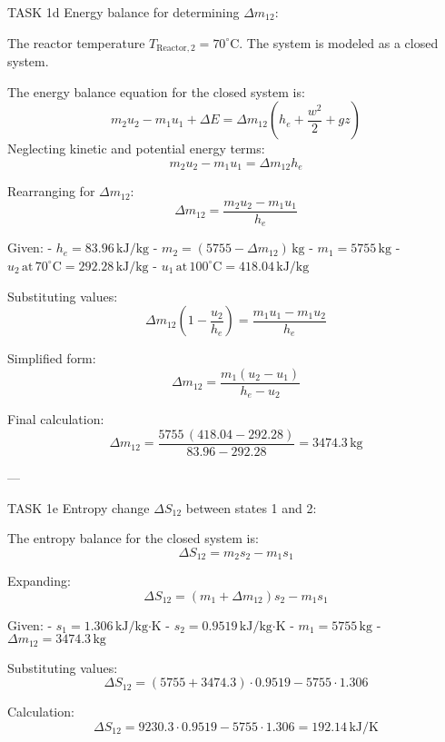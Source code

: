 TASK 1d  
Energy balance for determining \( \Delta m_{12} \):  

The reactor temperature \( T_{\text{Reactor},2} = 70^\circ\text{C} \).  
The system is modeled as a closed system.  

The energy balance equation for the closed system is:  
\[
m_2 u_2 - m_1 u_1 + \Delta E = \Delta m_{12} \left( h_e + \frac{w^2}{2} + g z \right)
\]  
Neglecting kinetic and potential energy terms:  
\[
m_2 u_2 - m_1 u_1 = \Delta m_{12} h_e
\]  

Rearranging for \( \Delta m_{12} \):  
\[
\Delta m_{12} = \frac{m_2 u_2 - m_1 u_1}{h_e}
\]  

Given:  
- \( h_e = 83.96 \, \text{kJ/kg} \)  
- \( m_2 = (5755 - \Delta m_{12}) \, \text{kg} \)  
- \( m_1 = 5755 \, \text{kg} \)  
- \( u_2 \, \text{at} \, 70^\circ\text{C} = 292.28 \, \text{kJ/kg} \)  
- \( u_1 \, \text{at} \, 100^\circ\text{C} = 418.04 \, \text{kJ/kg} \)  

Substituting values:  
\[
\Delta m_{12} \left( 1 - \frac{u_2}{h_e} \right) = \frac{m_1 u_1 - m_1 u_2}{h_e}
\]  

Simplified form:  
\[
\Delta m_{12} = \frac{m_1 (u_2 - u_1)}{h_e - u_2}
\]  

Final calculation:  
\[
\Delta m_{12} = \frac{5755 \, (418.04 - 292.28)}{83.96 - 292.28} = 3474.3 \, \text{kg}
\]  

---

TASK 1e  
Entropy change \( \Delta S_{12} \) between states 1 and 2:  

The entropy balance for the closed system is:  
\[
\Delta S_{12} = m_2 s_2 - m_1 s_1
\]  

Expanding:  
\[
\Delta S_{12} = (m_1 + \Delta m_{12}) s_2 - m_1 s_1
\]  

Given:  
- \( s_1 = 1.306 \, \text{kJ/kg·K} \)  
- \( s_2 = 0.9519 \, \text{kJ/kg·K} \)  
- \( m_1 = 5755 \, \text{kg} \)  
- \( \Delta m_{12} = 3474.3 \, \text{kg} \)  

Substituting values:  
\[
\Delta S_{12} = (5755 + 3474.3) \cdot 0.9519 - 5755 \cdot 1.306
\]  

Calculation:  
\[
\Delta S_{12} = 9230.3 \cdot 0.9519 - 5755 \cdot 1.306 = 192.14 \, \text{kJ/K}
\]  

